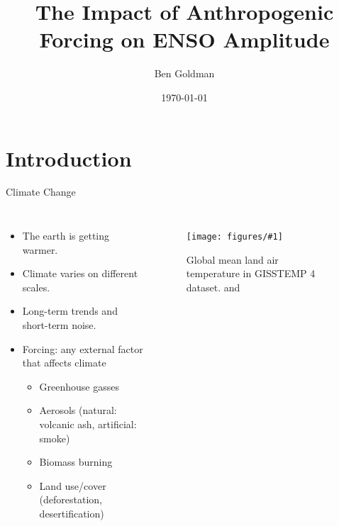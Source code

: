 \documentclass{beamer}
\title{The Impact of Anthropogenic Forcing on ENSO Amplitude}
\author{Ben Goldman}
\date{\today}
\newcommand{\myfig}[3]{
  \begin{figure}
    \centering
    \texttt{[image: figures/\#1]}
    \caption{#2}
    \label{fig:#3}
  \end{figure}
}
\begin{document}
\maketitle

\section{Introduction}

\begin{frame}{Climate Change}

  \begin{columns}
    \begin{itemize}
    \item The earth is getting warmer. \citep{pachauri2014climate}
    \item Climate varies on different scales.
    \item Long-term trends and short-term noise.
    \item Forcing: any external factor that affects climate
      \begin{itemize}
      \item Greenhouse gasses
      \item Aerosols (natural: volcanic ash, artificial: smoke)
      \item Biomass burning
      \item Land use/cover (deforestation, desertification)
      \end{itemize}
    \end{itemize}
    \myfig{intro_fig_3.pdf}{Global mean land air temperature in GISSTEMP 4 dataset. \citep{gistemp2019giss} and \citep{lenssen2019improvements}}{this}
  \end{columns}
\end{frame}
\end{document}
